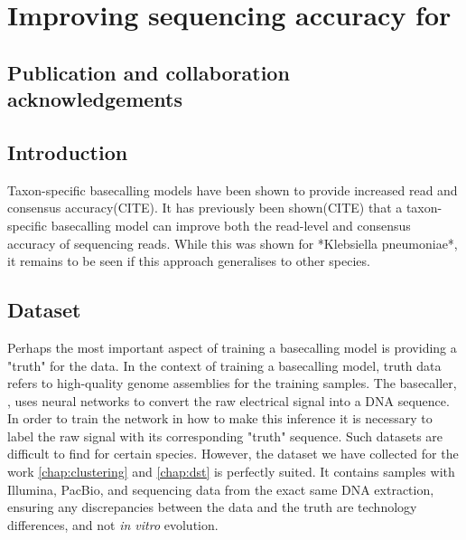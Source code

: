 \chapter{Improving \ont{} sequencing accuracy for \mtb{}}
\label{chap:tubby}

\setcounter{section}{-1}
\section{Publication and collaboration acknowledgements}
\label{sec:ch4-acknowledge}

\section{Introduction}

Taxon-specific \ont{} basecalling models have been shown to provide increased read and consensus accuracy(CITE).
It has previously been shown(CITE) that a taxon-specific basecalling model can improve both the read-level and consensus accuracy of \ont{} sequencing reads. While this was shown for *Klebsiella pneumoniae*, it remains to be seen if this approach generalises to other species.

\section{Dataset}
\label{sec:tubby-data}

 Perhaps the most important aspect of training a basecalling model is providing a "truth" for the data. In the context of training a \ont{} basecalling model, truth data refers to high-quality genome assemblies for the training samples. The \ont{} basecaller, \guppy{}, uses neural networks to convert the raw electrical signal into a DNA sequence. In order to train the network in how to make this inference it is necessary to label the raw signal with its corresponding "truth" sequence. Such datasets are difficult to find for certain species. However, the dataset we have collected for the work \autoref{chap:clustering} and \autoref{chap:dst} is perfectly suited. It contains samples with Illumina, PacBio, and \ont{} sequencing data from the exact same DNA extraction, ensuring any discrepancies between the \ont{} data and the truth are technology differences, and not \textit{in vitro} evolution. 

